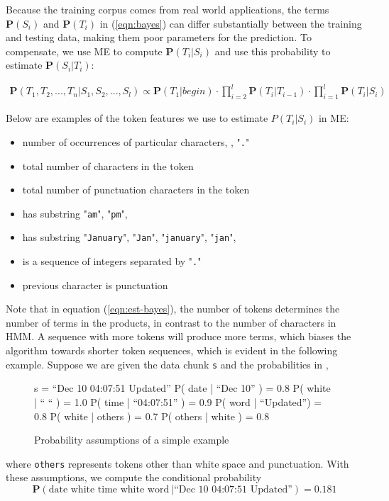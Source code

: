 Because the training corpus comes from real world applications, 
the terms $\mathbf{P}(S_i)$ and $\mathbf{P}(T_i)$ in (\ref{eqn:bayes})
can differ substantially between the training and
testing data, making them poor parameters for 
the prediction. To compensate, we use ME 
to compute 
$\mathbf{P}(T_i|S_i)$ and use this probability to estimate
$\mathbf{P}(S_i|T_i)$:

\begin{eqnarray}\label{eqn:est-bayes}
\mathbf{P}(T_1, T_2, ..., T_n|S_1, S_2, ..., S_l) \propto
\mathbf{P}(T_1|begin) \cdot \prod_{i=2}^{l}\mathbf{P}(T_i|T_{i-1})
\cdot \prod_{i=1}^{l}\mathbf{P}(T_i|S_i)
\end{eqnarray}

Below are examples of the token features we use to estimate
$P(T_i|S_i)$ in ME:

\begin{itemize}
\item number of occurrences of particular characters, \ie{}, "{\tt .}"
\item total number of characters in the token
\item total number of punctuation characters in the token
\item has substring "{\tt am}", "{\tt pm}", \etc{}
\item has substring "{\tt January}", "{\tt Jan}", "{\tt january}",
"{\tt jan}", \etc{}
\item is a sequence of integers separated by "{\tt .}"
\item previous character is punctuation
\end{itemize}

Note that in equation (\ref{eqn:est-bayes}), the number of tokens
determines the number of terms in the products, in contrast to the
number of characters in HMM. A sequence with more tokens will produce
more terms, which biases the algorithm towards shorter token
sequences, which is evident in the following example.  Suppose we are
given the data chunk {\tt s} and the probabilities in ,
\begin{figure}[t]
\begin{centercode}
s  = ``Dec 10 04:07:51 Updated''
P( date | ``Dec 10'' ) = 0.8
P( white | `` `` ) = 1.0
P( time | ``04:07:51'' ) = 0.9
P( word | ``Updated'') = 0.8
P( white | others ) = 0.7
P( others | white ) = 0.8
\end{centercode}
\caption{Probability assumptions of a simple example}\label{fig:ME}
\end{figure}
%
where {\tt others} represents tokens other than white space and
punctuation. With these assumptions, we compute the conditional probability
\[\mathbf{P}(\mbox{date white time white word}~ | \mbox{``Dec 10 04:07:51 Updated''}) = 0.181 \]

